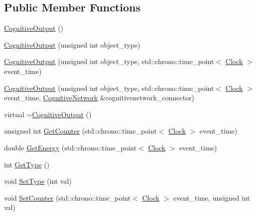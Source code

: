 \subsection*{Public Member Functions}
\begin{DoxyCompactItemize}
\item 
\mbox{\hyperlink{classCognitiveOutput_a743042cff5c36a76cd975767358e1bbf}{Cognitive\+Output}} ()
\item 
\mbox{\hyperlink{classCognitiveOutput_af1fca516a8a90913760e8ac5431f6f70}{Cognitive\+Output}} (unsigned int object\+\_\+type)
\item 
\mbox{\hyperlink{classCognitiveOutput_a4751f511d329c66ed80a3c127e5e9e6d}{Cognitive\+Output}} (unsigned int object\+\_\+type, std\+::chrono\+::time\+\_\+point$<$ \mbox{\hyperlink{universe_8h_a0ef8d951d1ca5ab3cfaf7ab4c7a6fd80}{Clock}} $>$ event\+\_\+time)
\item 
\mbox{\hyperlink{classCognitiveOutput_a9874901c7b49a6bb495d34c84fdbf651}{Cognitive\+Output}} (unsigned int object\+\_\+type, std\+::chrono\+::time\+\_\+point$<$ \mbox{\hyperlink{universe_8h_a0ef8d951d1ca5ab3cfaf7ab4c7a6fd80}{Clock}} $>$ event\+\_\+time, \mbox{\hyperlink{classCognitiveNetwork}{Cognitive\+Network}} \&cognitivenetwork\+\_\+connector)
\item 
virtual \mbox{\hyperlink{classCognitiveOutput_aefe310a8577684210d82236033791036}{$\sim$\+Cognitive\+Output}} ()
\item 
unsigned int \mbox{\hyperlink{classCognitiveOutput_a73efe6441491eb54df2f4dbd78b3903e}{Get\+Counter}} (std\+::chrono\+::time\+\_\+point$<$ \mbox{\hyperlink{universe_8h_a0ef8d951d1ca5ab3cfaf7ab4c7a6fd80}{Clock}} $>$ event\+\_\+time)
\item 
double \mbox{\hyperlink{classCognitiveOutput_abb923045db565ecdbac431469217cebf}{Get\+Energy}} (std\+::chrono\+::time\+\_\+point$<$ \mbox{\hyperlink{universe_8h_a0ef8d951d1ca5ab3cfaf7ab4c7a6fd80}{Clock}} $>$ event\+\_\+time)
\item 
int \mbox{\hyperlink{classCognitiveOutput_ac5ead5e6a98556d6779eda5679b69594}{Get\+Type}} ()
\item 
void \mbox{\hyperlink{classCognitiveOutput_ac76f41ab3b65ea466e9e2999270f2e5a}{Set\+Type}} (int val)
\item 
void \mbox{\hyperlink{classCognitiveOutput_a087e8bdab9eb6020dbbe6d47f524c8b6}{Set\+Counter}} (std\+::chrono\+::time\+\_\+point$<$ \mbox{\hyperlink{universe_8h_a0ef8d951d1ca5ab3cfaf7ab4c7a6fd80}{Clock}} $>$ event\+\_\+time, unsigned int val)
\item 

\end{DoxyCompactItemize}
